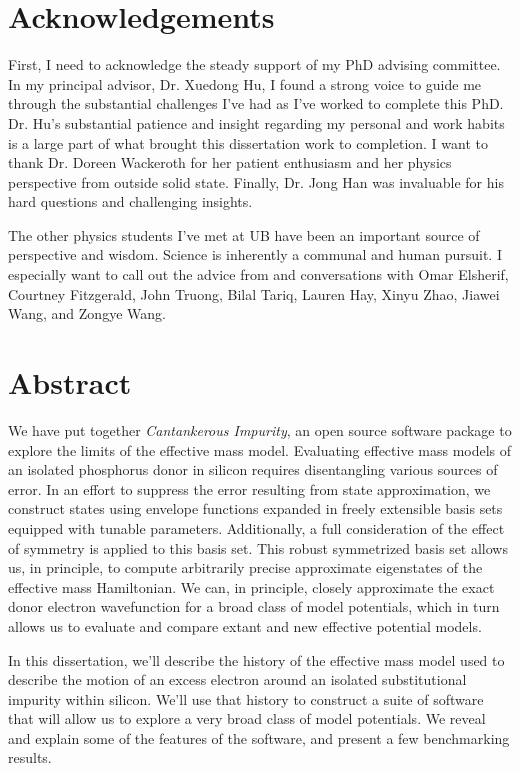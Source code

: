 \documentclass[12pt]{report}
\begin{document}
\newpage

\chapter*{Acknowledgements}
First, I need to acknowledge the steady support of my PhD advising committee. In
my principal advisor, Dr. Xuedong Hu, I found a strong voice to guide me through
the substantial challenges I've had as I've worked to complete this PhD. Dr.
Hu's substantial patience and insight regarding my personal and work habits is a
large part of what brought this dissertation work to completion. I want to thank
Dr. Doreen Wackeroth for her patient enthusiasm and her physics perspective from
outside solid state. Finally, Dr. Jong Han was invaluable for his hard questions
and challenging insights.

The other physics students I've met at UB have been an important source of
perspective and wisdom. Science is inherently a communal and human pursuit. I
especially want to call out the advice from and conversations with Omar
Elsherif, Courtney Fitzgerald, John Truong, Bilal Tariq, Lauren Hay, Xinyu Zhao,
Jiawei Wang, and Zongye Wang.

\chapter*{Abstract}

We have put together \emph{Cantankerous Impurity}, an open source software
package to explore the limits of the effective mass model. Evaluating effective
mass models of an isolated phosphorus donor in silicon requires disentangling
various sources of error. In an effort to suppress the error resulting from
state approximation, we construct states using envelope functions expanded in
freely extensible basis sets equipped with tunable parameters. Additionally, a
full consideration of the effect of symmetry is applied to this basis set. This
robust symmetrized basis set allows us, in principle, to compute arbitrarily
precise approximate eigenstates of the effective mass Hamiltonian. We can, in
principle, closely approximate the exact donor electron wavefunction for a broad
class of model potentials, which in turn allows us to evaluate and compare
extant and new effective potential models.

In this dissertation, we'll describe the history of the effective mass model
used to describe the motion of an excess electron around an isolated
substitutional impurity within silicon. We'll use that history to construct a
suite of software that will allow us to explore a very broad class of model
potentials. We reveal and explain some of the features of the software, and
present a few benchmarking results.
\end{document}
